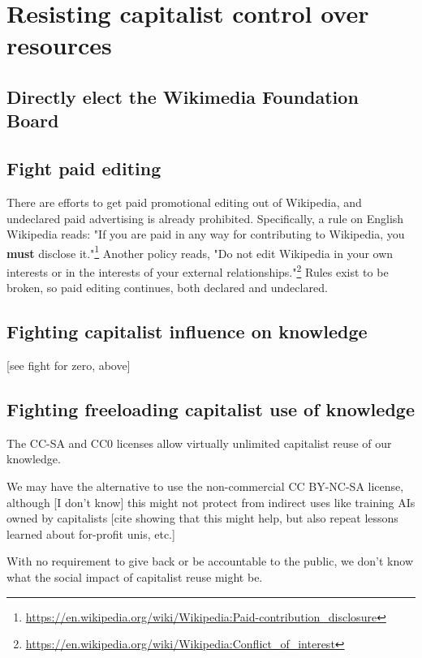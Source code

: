 
\section{Resisting capitalist control over resources}

\subsection{Directly elect the Wikimedia Foundation Board}

\subsection{Fight paid editing}

There are efforts to get paid promotional editing out of Wikipedia, and undeclared paid advertising is already prohibited.  Specifically, a rule on English Wikipedia reads: "If you are paid in any way for contributing to Wikipedia, you \textbf{must} disclose it."\footnote{\url{https://en.wikipedia.org/wiki/Wikipedia:Paid-contribution_disclosure}} Another policy reads, "Do not edit Wikipedia in your own interests or in the interests of your external relationships."\footnote{\url{https://en.wikipedia.org/wiki/Wikipedia:Conflict_of_interest}} Rules exist to be broken, so paid editing continues, both declared and undeclared.

\subsection{Fighting capitalist influence on knowledge}

[see fight for zero, above]

\subsection{Fighting freeloading capitalist use of knowledge}

The CC-SA and CC0 licenses allow virtually unlimited capitalist reuse of our knowledge.

We may have the alternative to use the non-commercial CC BY-NC-SA license, although [I don't know] this might not protect from indirect uses like training AIs owned by capitalists [cite showing that this might help, but also repeat lessons learned about for-profit unis, etc.]

With no requirement to give back or be accountable to the public, we don't know what the social impact of capitalist reuse might be.

